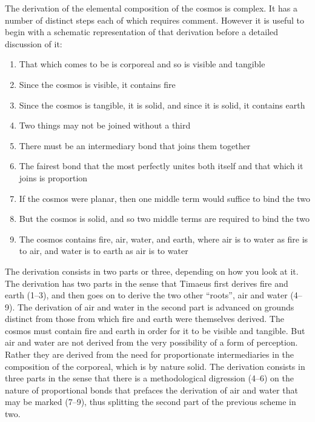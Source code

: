 The derivation of the elemental composition of the cosmos is complex. It has a number of distinct steps each of which requires comment. However it is useful to begin with a schematic representation of that derivation before a detailed discussion of it:
\begin{enumerate}
	\item That which comes to be is corporeal and so is visible and tangible
	\item Since the cosmos is visible, it contains fire
	\item Since the cosmos is tangible, it is solid, and since it is solid, it contains earth
	\item Two things may not be joined without a third
	\item There must be an intermediary bond that joins them together
	\item The fairest bond that the most perfectly unites both itself and that which it joins is proportion
	\item If the cosmos were planar, then one middle term would suffice to bind the two
	\item But the cosmos is solid, and so two middle terms are required to bind the two
	\item The cosmos contains fire, air, water, and earth, where air is to water as fire is to air, and water is to earth as air is to water
\end{enumerate}
The derivation consists in two parts or three, depending on how you look at it. The derivation has two parts in the sense that Timaeus first derives fire and earth (1--3), and then goes on to derive the two other ``roots'', air and water (4--9). The derivation of air and water in the second part is advanced on grounds distinct from those from which fire and earth were themselves derived. The cosmos must contain fire and earth in order for it to be visible and tangible. But air and water are not derived from the very possibility of a form of perception. Rather they are derived from the need for proportionate intermediaries in the composition of the corporeal, which is by nature solid. The derivation consists in three parts in the sense that there is a methodological digression (4--6) on the nature of proportional bonds that prefaces the derivation of air and water that may be marked (7--9), thus splitting the second part of the previous scheme in two.

